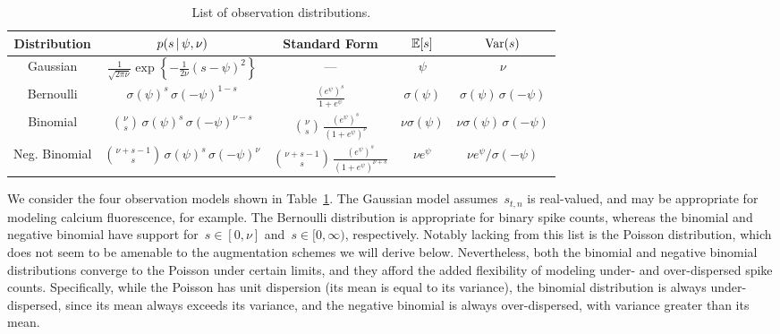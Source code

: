 \begin{table}
\begin{center}
\begin{tabular}{c|c|c|c|c}
  \textbf{Distribution} & $p(s \,|\, \psi, \nu)$ & Standard Form & $\mathbb{E}[s]$ & $\mathrm{Var}(s)$ \\
  \hline
  Gaussian & $\frac{1}{\sqrt{2 \pi \nu}}\exp \left \{ -\frac{1}{2 \nu} (s - \psi)^2 \right \}$
  & --- 
  & $\psi$ & $\nu$ \\
  Bernoulli & $\sigma(\psi)^s \, \sigma(-\psi)^{1-s}$
  & $\frac{(e^\psi)^s}{1+e^\psi}$
  & $\sigma(\psi)$ & $\sigma(\psi) \, \sigma(-\psi)$ \\
  Binomial & ${\nu \choose s} \, \sigma(\psi)^s \, \sigma(-\psi)^{\nu-s}$
  & ${\nu \choose s} \,\frac{(e^\psi)^s}{(1+e^\psi)^\nu}$
  & $\nu \sigma(\psi)$ & $\nu \sigma(\psi) \, \sigma(-\psi)$ \\
  Neg. Binomial & ${\nu + s -1 \choose s} \, \sigma(\psi)^s \, \sigma(-\psi)^{\nu}$
  & ${\nu +s - 1 \choose s} \,\frac{(e^\psi)^s}{(1+e^\psi)^{\nu+s}}$
  & $\nu e^\psi$ & $\nu e^\psi / \sigma(-\psi)$ \\
\end{tabular}
\end{center}
\caption{List of observation distributions.}
\label{tab:obs_models}
\end{table}

We consider the four observation models shown in Table~\ref{tab:obs_models}.
The Gaussian model assumes~$s_{t,n}$ is real-valued, and may be
appropriate for modeling calcium fluorescence, for example.
The Bernoulli distribution is appropriate for binary spike counts,
whereas the binomial and negative binomial have support
for~$s\in[0,\nu]$ and~$s \in [0, \infty)$, respectively.
Notably lacking from this list is the Poisson distribution,
which does not seem to be amenable to the augmentation schemes
we will derive below. Nevertheless, both the binomial and negative
binomial distributions converge to the Poisson under certain
limits, and they afford the added flexibility of modeling under- and
over-dispersed spike counts. Specifically, while the Poisson has unit 
dispersion (its mean is equal to its variance), the binomial distribution 
is always under-dispersed, since its mean always exceeds its variance, 
and the negative binomial is always over-dispersed, with variance greater 
than its mean.

